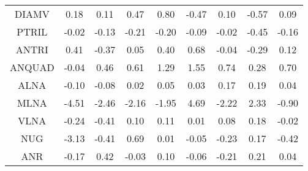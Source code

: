 \documentclass[11pt,a4paper]{report}
\begin{document}
\begin{longtable}{ | c || c | c | c | c | c | c | c || c |}
DIAMV &  \cellcolor[HTML]{F7F7FF} 0.18 &  \cellcolor[HTML]{FFFFFF} 0.11 &  \cellcolor[HTML]{F7F7FF} 0.47 &  \cellcolor[HTML]{E7E7FF} 0.80 &  \cellcolor[HTML]{FFF7F7} -0.47 &  \cellcolor[HTML]{FFFFFF} 0.10 &  \cellcolor[HTML]{FFEFEF} -0.57 &  \cellcolor[HTML]{FFFFFF} 0.09 \\
PTRIL &  \cellcolor[HTML]{FFFFFF} -0.02 &  \cellcolor[HTML]{FFFFFF} -0.13 &  \cellcolor[HTML]{FFF7F7} -0.21 &  \cellcolor[HTML]{FFF7F7} -0.20 &  \cellcolor[HTML]{FFFFFF} -0.09 &  \cellcolor[HTML]{FFFFFF} -0.02 &  \cellcolor[HTML]{FFF7F7} -0.45 &  \cellcolor[HTML]{FFF7F7} -0.16 \\
ANTRI &  \cellcolor[HTML]{F7F7FF} 0.41 &  \cellcolor[HTML]{FFF7F7} -0.37 &  \cellcolor[HTML]{FFFFFF} 0.05 &  \cellcolor[HTML]{F7F7FF} 0.40 &  \cellcolor[HTML]{EFEFFF} 0.68 &  \cellcolor[HTML]{FFFFFF} -0.04 &  \cellcolor[HTML]{FFF7F7} -0.29 &  \cellcolor[HTML]{FFFFFF} 0.12 \\
ANQUAD &  \cellcolor[HTML]{FFFFFF} -0.04 &  \cellcolor[HTML]{F7F7FF} 0.46 &  \cellcolor[HTML]{EFEFFF} 0.61 &  \cellcolor[HTML]{DFDFFF} 1.29 &  \cellcolor[HTML]{D7D7FF} 1.55 &  \cellcolor[HTML]{EFEFFF} 0.74 &  \cellcolor[HTML]{F7F7FF} 0.28 &  \cellcolor[HTML]{EFEFFF} 0.70 \\
ALNA &  \cellcolor[HTML]{FFFFFF} -0.10 &  \cellcolor[HTML]{FFFFFF} -0.08 &  \cellcolor[HTML]{FFFFFF} 0.02 &  \cellcolor[HTML]{FFFFFF} 0.05 &  \cellcolor[HTML]{FFFFFF} 0.03 &  \cellcolor[HTML]{F7F7FF} 0.17 &  \cellcolor[HTML]{F7F7FF} 0.19 &  \cellcolor[HTML]{FFFFFF} 0.04 \\
MLNA &  \cellcolor[HTML]{FF8F8F} -4.51 &  \cellcolor[HTML]{FFBFBF} -2.46 &  \cellcolor[HTML]{FFC7C7} -2.16 &  \cellcolor[HTML]{FFCFCF} -1.95 &  \cellcolor[HTML]{8787FF} 4.69 &  \cellcolor[HTML]{FFC7C7} -2.22 &  \cellcolor[HTML]{C7C7FF} 2.33 &  \cellcolor[HTML]{FFE7E7} -0.90 \\
VLNA &  \cellcolor[HTML]{FFF7F7} -0.24 &  \cellcolor[HTML]{FFF7F7} -0.41 &  \cellcolor[HTML]{FFFFFF} 0.10 &  \cellcolor[HTML]{FFFFFF} 0.11 &  \cellcolor[HTML]{FFFFFF} 0.01 &  \cellcolor[HTML]{FFFFFF} 0.08 &  \cellcolor[HTML]{F7F7FF} 0.18 &  \cellcolor[HTML]{FFFFFF} -0.02 \\
NUG &  \cellcolor[HTML]{FFAFAF} -3.13 &  \cellcolor[HTML]{FFF7F7} -0.41 &  \cellcolor[HTML]{EFEFFF} 0.69 &  \cellcolor[HTML]{FFFFFF} 0.01 &  \cellcolor[HTML]{FFFFFF} -0.05 &  \cellcolor[HTML]{FFF7F7} -0.23 &  \cellcolor[HTML]{F7F7FF} 0.17 &  \cellcolor[HTML]{FFF7F7} -0.42 \\
ANR &  \cellcolor[HTML]{FFF7F7} -0.17 &  \cellcolor[HTML]{F7F7FF} 0.42 &  \cellcolor[HTML]{FFFFFF} -0.03 &  \cellcolor[HTML]{FFFFFF} 0.10 &  \cellcolor[HTML]{FFFFFF} -0.06 &  \cellcolor[HTML]{FFF7F7} -0.21 &  \cellcolor[HTML]{F7F7FF} 0.21 &  \cellcolor[HTML]{FFFFFF} 0.04 \\

\end{longtable}
\end{document}
